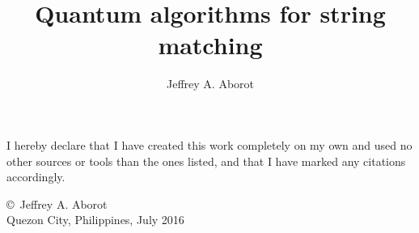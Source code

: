 \documentclass{report}
\begin{document}
        
            \title{Quantum algorithms for string matching}
            
            \author{Jeffrey A. Aborot} %
            
            
            
            
            
            
            \ssp %
            \beforepreface
            
            
            
            
            
            \pagebreak
            
            \null
            \vfill
            
            I hereby declare that I have created this work completely on my own and used no other sources or
            tools than the ones listed, and that I have marked any citations accordingly.\\
            
            \begin{flushright}
            \copyright~Jeffrey A. Aborot \\%
            Quezon City, Philippines, July 2016\\
            \end{flushright}
            
\end{document}
